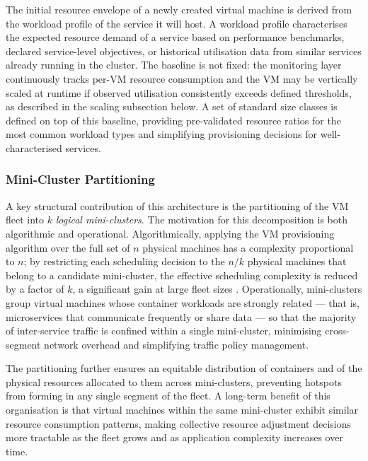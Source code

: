 \documentclass[a4paper, 12pt]{report}
\begin{document}
The initial resource envelope of a newly created virtual machine is
derived from the workload profile of the service it will host.  A
workload profile characterises the expected resource demand of a service
based on performance benchmarks, declared service-level objectives, or
historical utilisation data from similar services already running in the
cluster.  The baseline is not fixed: the monitoring layer continuously
tracks per-VM resource consumption and the VM may be vertically scaled
at runtime if observed utilisation consistently exceeds defined
thresholds, as described in the scaling subsection below.  A set of
standard size classes is defined on top of this baseline, providing
pre-validated resource ratios for the most common workload types and
simplifying provisioning decisions for well-characterised services.
 
\subsubsection{Mini-Cluster Partitioning}
 
A key structural contribution of this architecture is the partitioning
of the VM fleet into $k$ \textit{logical mini-clusters}.  The motivation
for this decomposition is both algorithmic and operational.  Algorithmically,
applying the VM provisioning algorithm over the full set of $n$ physical
machines has a complexity proportional to $n$; by restricting each
scheduling decision to the $n/k$ physical machines that belong to a
candidate mini-cluster, the effective scheduling complexity is reduced
by a factor of $k$, a significant gain at large fleet sizes
\cite{tanenbaum2017distributed}.  Operationally, mini-clusters group
virtual machines whose container workloads are strongly related --- that
is, microservices that communicate frequently or share data --- so that
the majority of inter-service traffic is confined within a single
mini-cluster, minimising cross-segment network overhead and simplifying
traffic policy management.
 
The partitioning further ensures an equitable distribution of containers
and of the physical resources allocated to them across mini-clusters,
preventing hotspots from forming in any single segment of the fleet.
A long-term benefit of this organisation is that virtual machines within
the same mini-cluster exhibit similar resource consumption patterns,
making collective resource adjustment decisions more tractable as the
fleet grows and as application complexity increases over time.
 
\end{document}
